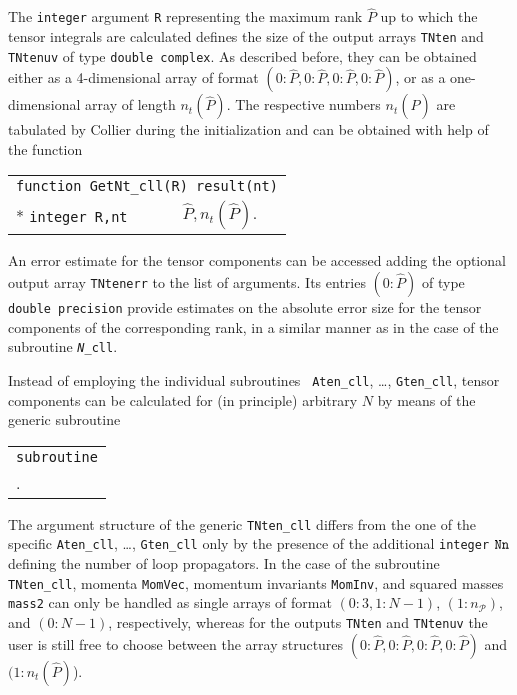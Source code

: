 \documentclass[preprint,sort&compress,12pt]{elsarticle}
\makeatletter
\def\bce{\begin{center}}
\def\ece{\end{center}}
\newcommand{\collier}{{\sc Collier}}
\newcommand{\nTn}{{\tt Nn}}
\newlength{\parwidth}\newlength{\colonewidth}%
\newlength{\restpageheight}
\newcommand{\cpcsuptable}[2]
{\settowidth{\colonewidth}{#1}\setlength{\parwidth}{\textwidth}%
\addtolength{\parwidth}{-\colonewidth}\addtolength{\parwidth}{-3em}%
\bce
\setlength{\restpageheight}{\@colroom}\addtolength{\restpageheight}{-\pagetotal}
\ifdim \restpageheight<20pt \pagebreak\fi
\begin{supertabular}[l]{p{\colonewidth}@{ }c@{ }p{\parwidth}}
#2
\end{supertabular}%
\ece
}%
\renewcommand{\cpcsuptable}[2]%
{\settowidth{\colonewidth}{#1}\setlength{\parwidth}{\textwidth}%
\addtolength{\parwidth}{-\colonewidth}\addtolength{\parwidth}{-3em}%
\begin{center}
\setlength{\restpageheight}{\@colroom}\addtolength{\restpageheight}{-\pagetotal}%
\ifdim \restpageheight<20pt \pagebreak\fi
\begin{supertabular}[l]{p{\colonewidth}@{ : }p{\parwidth}}%
#2
\end{supertabular}%
\end{center}
}%
\newcommand{\cpcsub}[1]
{%
\setlength{\parwidth}{\textwidth}\addtolength{\parwidth}{-2.1em}%
\bce
\begin{tabular}[t]{@{}p{\parwidth}@{}}
#1
\end{tabular}
\ece
}%
\makeatother
\begin{document}
The {\tt integer} argument {\tt R} representing the maximum rank
$\widehat{P}$ up to which the tensor integrals are calculated defines
the size of the output arrays {\tt TNten} and {\tt TNtenuv} of type
{\tt double complex}. As described before, they can be obtained either
as a 4-dimensional array of format
$(0\!:\!\widehat{P},0\!:\!\widehat{P},0\!:\!\widehat{P},0\!:\!\widehat{P})$,
or as a one-dimensional array of length $n_t(\widehat{P})$.
The respective numbers $n_t(\widehat{P})$ are tabulated by {\collier} during the initialization and can be obtained with help of the function
\cpcsuptable{\tt integer N,nt }{%
  \multicolumn{2}{l}{\tt function {GetNt}\_cll(R) result(nt)}\\*
  \tt integer R,nt & $\widehat{P},n_t(\widehat{P})$\;.\\
  }
An error estimate for the tensor components can be accessed
adding the optional output array {\tt TNtenerr} to the list of
arguments. Its entries $(0\!:\!\widehat{P})$ of type {\tt double
  precision} provide estimates on the absolute error size for the
tensor components of the corresponding rank, in a similar manner as in
the case of the subroutine {\tt {\it N}\_cll}.

Instead of employing the individual subroutines {\tt
  Aten\_cll}, \ldots, {\tt Gten\_cll}, tensor components can be calculated
for (in principle) arbitrary $N$ by means of the generic subroutine
\cpcsub{
  {\tt subroutine} \\ \quad {\tt   TNten\_cll(TNten,TNtenuv,MomVec,MomInv,mass2,\nTn,R,TNtenerr)}\;.\\
  } 
The argument structure of the generic {\tt TNten\_cll} differs
from the one of the specific {\tt Aten\_cll}, \ldots, {\tt Gten\_cll}
only by the presence of the additional {\tt integer} $\nTn$ defining
the
number of loop propagators. In the case of the subroutine {\tt
  TNten\_cll}, momenta {\tt MomVec}, momentum invariants {\tt MomInv},
and squared masses {\tt mass2} can only be handled as single arrays of
format $(\mbox{$0\!:\!3$},\mbox{$1\!:\!N-1$})$, $(1\!:\!n_\mathcal{P})$, 
and $(0\!:\!N-1)$, respectively, whereas for the outputs {\tt TNten} and {\tt TNtenuv} 
the user is still free to choose between the array structures 
$(0\!:\!\widehat{P},0\!:\!\widehat{P},0\!:\!\widehat{P},0\!:\!\widehat{P})$ and $(1\!:\!n_t(\widehat{P})$).
\end{document}
